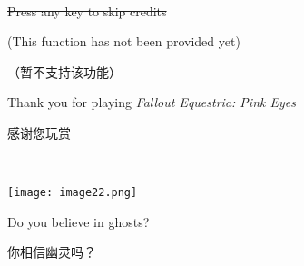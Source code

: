 ~\vfill

\begin{center}

\begin{englishpar}
    \sout{Press any key to skip credits}
    
    (This function has not been provided yet)
\end{englishpar}


（暂不支持该功能）

\begin{englishpar}
    Thank you for playing \emph{Fallout Equestria: Pink Eyes}
\end{englishpar}

感谢您玩赏
\end{center}

~\vfill

\texttt{[image: image22.png]}

\begin{motto}
    Do you believe in ghosts?

    你相信幽灵吗？
\end{motto}

